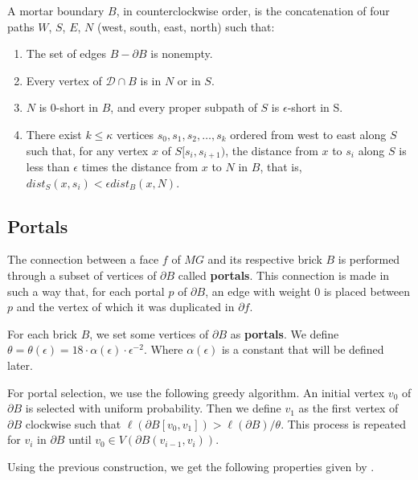 \begin{lemma}
    A mortar boundary \(B\), in counterclockwise order, is the concatenation of four paths \(W\), \(S\), \(E\), \(N\) (west, south, east, north) such that:
    \begin{enumerate}
        \item The set of edges \(B - \partial B\) is nonempty.
        \item Every vertex of \(\mathcal{D} \cap B\) is in \(N\) or in \(S\).
        \item \(N\) is \(0\)-short in \(B\), and every proper subpath of \(S\) is \(\epsilon\)-short in S.
        \item There exist \(k \leq \kappa\) vertices \(s_0, s_1, s_2, \dots, s_k\) ordered from west to east along \(S\) such that, for any vertex \(x\) of \(S[s_i, s_{i+1})\), the distance from \(x\) to \(s_i\) along \(S\) is less than \(\epsilon\) times the distance from \(x\) to \(N\) in \(B\), that is, \(dist_S(x, s_i) < \epsilon dist_B(x, N)\).
    \end{enumerate}
\end{lemma}

\subsection{Portals}

The connection between a face \(f\) of \(MG\) and its respective brick \(B\) is performed through a subset of vertices of \(\partial B\) called \textbf{portals}. This connection is made in such a way that, for each portal \(p\) of \(\partial B\), an edge with weight 0 is placed between \(p\) and the vertex of which it was duplicated in \(\partial f\).

For each brick \(B\), we set some vertices of \(\partial B\) as \textbf{portals}. We define \(\theta = \theta(\epsilon) = 18 \cdot \alpha(\epsilon) \cdot \epsilon ^ {-2}\). Where \(\alpha(\epsilon)\) is a constant that will be defined later.

For portal selection, we use the following greedy algorithm. An initial vertex \(v_0\) of \(\partial B\) is selected with uniform probability. Then we define \(v_1\) as the first vertex of \(\partial B\) clockwise such that \(\ell(\partial B[v_0, v_1]) > \ell(\partial B) / \theta\). This process is repeated for \(v_i\) in \(\partial B\) until \(v_0 \in V(\partial B (v_{i-1}, v_i))\).

Using the previous construction, we get the following properties given by \cite{Borradaile2009b}.

